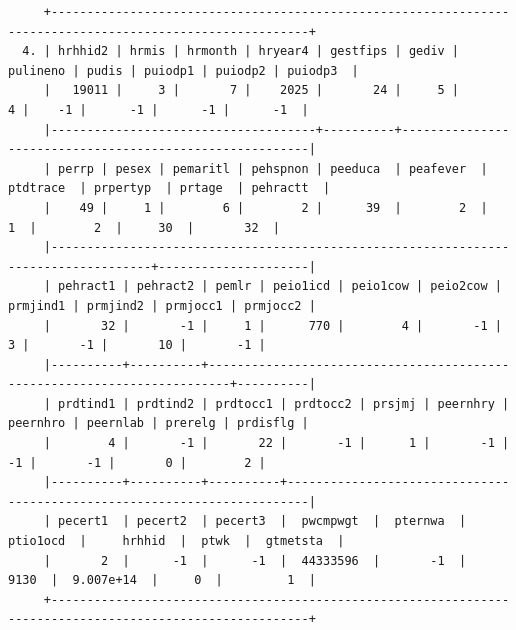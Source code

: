 \documentclass[
]{book}
\begin{document}
\begin{verbatim}
     +----------------------------------------------------------------------------------------------------------+
  4. | hrhhid2 | hrmis | hrmonth | hryear4 | gestfips | gediv | pulineno | pudis | puiodp1 | puiodp2 | puiodp3  |
     |   19011 |     3 |       7 |    2025 |       24 |     5 |        4 |    -1 |      -1 |      -1 |      -1  |
     |-------------------------------------+----------+---------------------------------------------------------|
     | perrp | pesex | pemaritl | pehspnon | peeduca  | peafever  | ptdtrace  | prpertyp  | prtage  | pehractt  |
     |    49 |     1 |        6 |        2 |      39  |        2  |        1  |        2  |     30  |       32  |
     |------------------------------------------------------------------------------------+---------------------|
     | pehract1 | pehract2 | pemlr | peio1icd | peio1cow | peio2cow | prmjind1 | prmjind2 | prmjocc1 | prmjocc2 |
     |       32 |       -1 |     1 |      770 |        4 |       -1 |        3 |       -1 |       10 |       -1 |
     |----------+----------+-------------------------------------------------------------------------+----------|
     | prdtind1 | prdtind2 | prdtocc1 | prdtocc2 | prsjmj | peernhry | peernhro | peernlab | prerelg | prdisflg |
     |        4 |       -1 |       22 |       -1 |      1 |       -1 |       -1 |       -1 |       0 |        2 |
     |----------+----------+----------+-------------------------------------------------------------------------|
     | pecert1  | pecert2  | pecert3  |  pwcmpwgt  |  pternwa  |  ptio1ocd  |     hrhhid  |  ptwk  |  gtmetsta  |
     |       2  |      -1  |      -1  |  44333596  |       -1  |      9130  |  9.007e+14  |     0  |         1  |
     +----------------------------------------------------------------------------------------------------------+


\end{verbatim}
\end{document}
